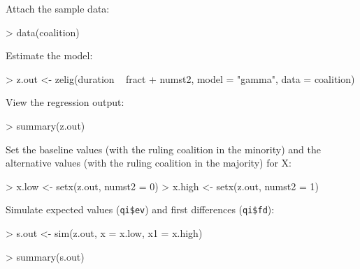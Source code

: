 \documentclass{article}
\begin{document}
Attach the sample data: 
\begin{Schunk}
\begin{Sinput}
> data(coalition)
\end{Sinput}
\end{Schunk}
Estimate the model: 
\begin{Schunk}
\begin{Sinput}
> z.out <- zelig(duration ~ fract + numst2, model = "gamma", data = coalition)
\end{Sinput}
\end{Schunk}
View the regression output:  
\begin{Schunk}
\begin{Sinput}
> summary(z.out)
\end{Sinput}
\end{Schunk}
Set the baseline values (with the ruling coalition in the minority)
and the alternative values (with the ruling coalition in the majority)
for X:
\begin{Schunk}
\begin{Sinput}
> x.low <- setx(z.out, numst2 = 0)
> x.high <- setx(z.out, numst2 = 1)
\end{Sinput}
\end{Schunk}
Simulate expected values ({\tt qi\$ev}) and first differences ({\tt qi\$fd}):
\begin{Schunk}
\begin{Sinput}
> s.out <- sim(z.out, x = x.low, x1 = x.high)
\end{Sinput}
\end{Schunk}
\begin{Schunk}
\begin{Sinput}
> summary(s.out)
\end{Sinput}
\end{Schunk}
\end{document}
